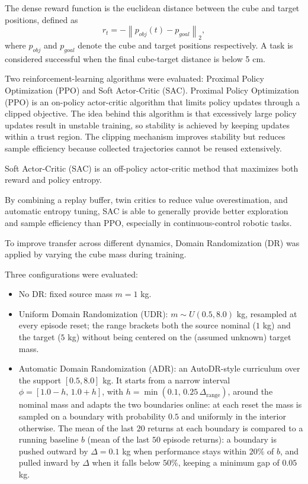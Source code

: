 The dense reward function is the euclidean distance between the cube and target positions, defined as
\[
r_t = -\left\| p_{obj}(t)-p_{goal} \right\|_2,
\]
where $p_{obj}$ and $p_{goal}$ denote the cube and target positions respectively. A task is considered successful when the final cube-target distance is below 5 cm.

Two reinforcement-learning algorithms were evaluated: Proximal Policy Optimization (PPO) and Soft Actor-Critic (SAC).
Proximal Policy Optimization (PPO) \cite{SchulmanPPO2017} is an on-policy actor-critic algorithm that limits policy updates through a clipped objective.
The idea behind this algorithm is that excessively large policy updates result in unstable training, so stability is achieved by keeping updates within a trust region.
The clipping mechanism improves stability but reduces sample efficiency because collected trajectories cannot be reused extensively.


Soft Actor-Critic (SAC) \cite{SAC2018} is an off-policy actor-critic method that maximizes both reward and policy entropy.

By combining a replay buffer, twin critics to reduce value overestimation, and automatic entropy tuning, 
SAC is able to generally provide better exploration and sample efficiency than PPO, especially in continuous-control robotic tasks.

To improve transfer across different dynamics, Domain Randomization (DR) was applied by varying the cube mass during training.

Three configurations were evaluated:
\begin{itemize}
    \item No DR: fixed source mass $m=1$ kg.
    \item Uniform Domain Randomization (UDR): $m \sim U(0.5,8.0)$ kg, resampled at every episode reset; the range brackets both the source nominal ($1$ kg) and the target ($5$ kg) without being centered on the (assumed unknown) target mass.
    \item Automatic Domain Randomization (ADR): an AutoDR-style curriculum over the support $[0.5,8.0]$ kg. It starts from a narrow interval $\phi=[1.0-h,\,1.0+h]$, with $h=\min(0.1,\,0.25\,\Delta_{\text{range}})$,
    around the nominal mass and adapts the two boundaries online: at each reset the mass is sampled on a boundary with probability $0.5$ and uniformly in the interior otherwise.
    The mean of the last $20$ returns at each boundary is compared to a running baseline $b$ (mean of the last $50$ episode returns): a boundary is pushed outward by $\Delta=0.1$ kg when performance stays within $20\%$ of $b$, and pulled inward by $\Delta$ when it falls below $50\%$, keeping a minimum gap of $0.05$ kg.
\end{itemize}

